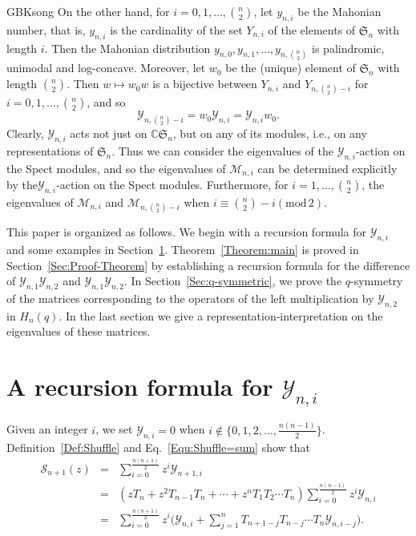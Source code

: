 \documentclass[13pt,a4paper, oneside]{amsart}       %
\numberwithin{equation}{section}
\theoremstyle{definition}
\theoremstyle{remark}
\begin{document}
\begin{CJK*}{GBK}{song}
On the other hand, for $i=0,1,\ldots,\binom{n}{2}$, let $y_{n,i}$ be the Mahonian number, that is, $y_{n,i}$ is the cardinality of the set $Y_{n,i}$  of the elements of $\mathfrak{S}_n$ with length $i$. Then the Mahonian distribution $y_{n,0},y_{n,1},\ldots, y_{n,\binom{n}{2}}$ is palindromic, unimodal and log-concave. Moreover, let $w_0$ be the (unique) element of $\mathfrak{S}_n$ with length $\binom{n}{2}$. Then $w\mapsto w_0w$ is a bijective between $Y_{n,i}$ and $Y_{n,\binom{n}{2}-i}$ for $i=0, 1,\ldots, \binom{n}{2}$, and so
\begin{equation*}
\mathscr{Y}_{n,\binom{n}{2}-i}=w_{0}\mathscr{Y}_{n,i}=\mathscr{Y}_{n,i}w_0.
\end{equation*}
Clearly, $\mathscr{Y}_{n,i}$ acts not just on $\mathbb{C}\mathfrak{S}_n$, but on any of its modules, i.e., on any representations of $\mathfrak{S}_n$. Thus we can consider the eigenvalues of the $\mathscr{Y}_{n,i}$-action on the Spect modules, and so the eigenvalues of $\mathscr{M}_{n,i}$ can be determined explicitly by the$\mathscr{Y}_{n,i}$-action on the Spect modules. Furthermore, for $i=1, \ldots, \binom{n}{2}$, the eigenvalues of $\mathscr{M}_{n,i}$ and $\mathscr{M}_{n,\binom{n}{2}-i}$ when $i\equiv \binom{n}{2}-i(\mathrm{mod}\,2)$.


This paper is organized as follows. We begin with a recursion formula  for $\mathscr{Y}_{n,i}$ and some examples in Section~\ref{Sec:Recursion}. Theorem~\ref{Theorem:main} is proved in Section~\ref{Sec:Proof-Theorem} by establishing a recursion formula for the difference of $\mathscr{Y}_{n,1}\mathscr{Y}_{n,2}$  and $\mathscr{Y}_{n,1}\mathscr{Y}_{n,2}$. In Section~\ref{Sec:q-symmetric}, we prove the $q$-symmetry of the matrices corresponding to the operators of the left multiplication by $\mathscr{Y}_{n,2}$ in $H_n(q)$. In the last section we give a representation-interpretation on the eigenvalues of these matrices.

\section{A recursion formula for $\mathscr{Y}_{n,i}$}\label{Sec:Recursion}
Given an integer $i$, we set $\mathscr{Y}_{n,i}=0$ when $i\notin\{0,1,2,\ldots,\frac{n(n-1)}{2}\}$. Definition~\ref{Def:Shuffle} and Eq.~\eqref{Equ:Shuffle=sum} show that
\begin{eqnarray*}
\mathscr{S}_{n+1}(z)&=&\sum_{i=0}^{\frac{n(n+1)}{2}}z^i\mathscr{Y}_{n+1,i}\\
&=&(zT_n+z^2T_{n-1}T_{n}+\cdots+z^nT_1T_2\cdots T_n)\sum_{i=0}^{\frac{n(n-1)}{2}}z^i\mathscr{Y}_{n,i}\\
&=&\sum_{i=0}^{\frac{n(n+1)}{2}}z^i\biggl(\mathscr{Y}_{n,i}+
\sum_{j=1}^{n}T_{n+1-j}T_{n-j}\cdots T_n\mathscr{Y}_{n,i-j}
\biggr).
\end{eqnarray*}


\end{CJK*}
\end{document}

